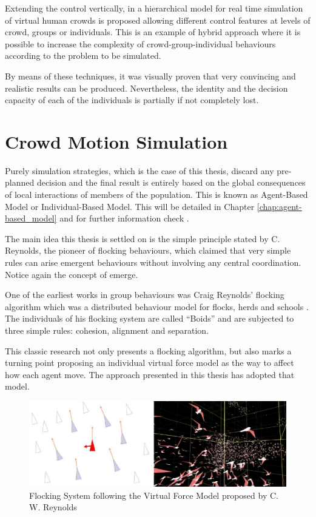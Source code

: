 Extending the control vertically, in \citep{musse2} a hierarchical model for real time simulation of virtual human crowds is proposed allowing different control features at levels of crowd, groups or individuals. This is an example of hybrid approach where it is possible to increase the complexity of crowd-group-individual behaviours according to the problem to be simulated.

By means of these techniques, it was visually proven that very convincing and realistic results can be produced. Nevertheless, the identity and the decision capacity of each of the individuals is partially if not completely lost.

\section{Crowd Motion Simulation}

Purely simulation strategies, which is the case of this thesis, discard any pre-planned decision and the final result is entirely based on the global consequences of local interactions of members of the population. This is known as Agent-Based Model or Individual-Based Model. This will be detailed in Chapter \ref{chap:agent-based_model} and for further information check  \citep{red3D}.

The main idea this thesis is settled on is the simple principle stated by C. Reynolds, the pioneer of flocking behaviours, which claimed that very simple rules can arise emergent behaviours without involving any central coordination. Notice again the concept of emerge.

One of the earliest works  in group behaviours was Craig Reynolds' flocking algorithm which was a distributed behaviour model for flocks, herds and schools \citep{reynolds}. The individuals of his flocking system are called ``Boids'' and are subjected to three simple rules: cohesion, alignment and separation.

This classic research not only presents a flocking algorithm, but also marks a turning point proposing an individual virtual force model as the way to affect how each agent move. The approach presented in this thesis has adopted that model.

\begin{figure}[!htb]
  \centering
  \includegraphics[scale=0.65]{reynolds_flocking.eps}
  \caption[Flocking System]{Flocking System following the Virtual Force Model proposed by C. W. Reynolds \citep{reynolds}}
  \label{fig:massive}
\end{figure}

